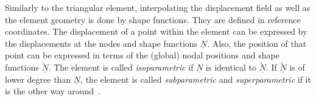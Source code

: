   Similarly to the triangular element, interpolating the displacement field as well as the element geometry is done by shape functions. They are defined in reference coordinates. The displacement of a point within the element can be expressed by the displacements at the nodes and shape functions $\underline{N}$. Also, the position of that point can be expressed in terms of the (global) nodal positions and shape functions $\underline{\tilde{N}}$. The element is called \textit{isoparametric} if $\underline{N}$ is identical to $\underline{\tilde{N}}$. If $\underline{\tilde{N}}$ is of lower degree than $\underline{N}$, the element is called \textit{subparametric} and \textit{superparametric} if it is the other way around~\cite{cook2002concepts}.
  
